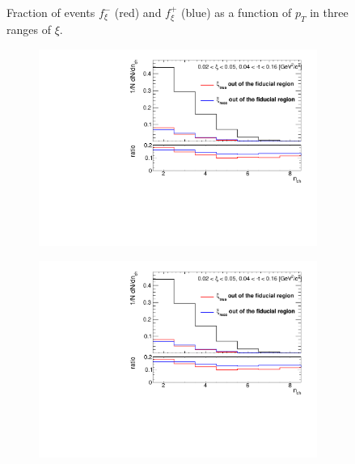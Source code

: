 \begin{figure}[h!]
\begin{subfigure}{.49\textwidth}
	\end{subfigure}
	\begin{minipage}{.49\textwidth}
		\caption[Fraction of events $f_{\xi}^-$ and $f_{\xi}^+$ as a function of $p_T$ in three ranges of $\xi$]{Fraction of events $f_{\xi}^-$ (red) and $f_{\xi}^+$ (blue) as a function of $p_T$ in three ranges of $\xi$.}
		\label{fig:xi_correction_pt}
	\end{minipage}
	
\end{figure}

\begin{figure}[h!]
	\centering
	\begin{subfigure}{.49\textwidth}
		\includegraphics[width=\textwidth,page=7]{chapters/chrgSTAR/img/xiMigration/xi.pdf}
	\end{subfigure}
	\begin{subfigure}{.49\textwidth}
		\includegraphics[width=\textwidth,page=8]{chapters/chrgSTAR/img/xiMigration/xi.pdf}

\end{subfigure}
\end{figure}
